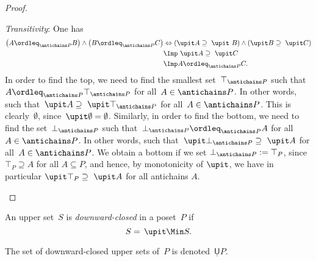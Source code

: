 \begin{proof}
\begin{compactitem}
        \item \emph{Transitivity}: One has
        \begin{equation}
            \begin{aligned}
                \left(A\ordleq_{\antichains P} B\right) \wedge \left(B\ordleq_{\antichains P} C\right)&\Leftrightarrow  \left(\upit  A \supseteq \ \upit  \ B\right) \wedge \left( \upit   B\supseteq \ \upit  C\right)\\
                &\Imp \ \upit  A\supseteq \ \upit  C\\
                &\Imp A\ordleq_{\antichains P}C.
            \end{aligned}
        \end{equation}
        In order to find the top, we need to find the smallest set~$\top_{\antichains P}$ such that~$A\ordleq_{\antichains P} \top_{\antichains P}$ for all~$A\in \antichains P$. In other words, such that~$\upit  A\supseteq \ \upit  \top_{\antichains P}$ for all~$A\in \antichains P$. This is clearly~$\emptyset$, since~$\upit  \emptyset = \emptyset$. Similarly, in order to find the bottom, we need to find the set~$\bot_{\antichains P}$ such that~$\bot_{\antichains P} \ordleq_{\antichains P} A$ for all~$A\in \antichains P$. In other words, such that~$\upit  \bot_{\antichains P} \supseteq \ \upit  A$ for all~$A\in \antichains P$. We obtain a bottom if we set $\bot_{\antichains P} := \top_P$, since $\top_P \supseteq A$ for all $A \subseteq P$, and hence, by monotonicity of $\upit $, we have in particular $\upit  \top_P \supseteq \ \upit  A$ for all antichains $A$.
    \end{compactitem}
\end{proof}



\begin{definition}
    \label{def:downward-closed-upperset}
    An upper set~$S$ is \emph{downward-closed} in a poset~$P$ if
    \begin{equation}
        S =\, \upit  \Min S.
    \end{equation}
\end{definition}

\begin{remark}
    The set of downward-closed upper sets of~$P$ is denoted~$\underline{\mathsf{U}}P$.
\end{remark}

